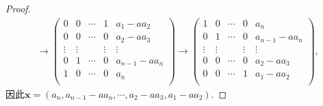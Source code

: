 \documentclass[../../main.tex]{subfiles}
\begin{document}
\begin{proof}
\begin{gather*}
\rightarrow \left( \begin{matrix}
0&		0&		\cdots&		1&		a_1-aa_2\\
0&		0&		\cdots&		0&		a_2-aa_3\\
\vdots&		\vdots&		&		\vdots&		\vdots\\
0&		1&		\cdots&		0&		a_{n-1}-aa_n\\
1&		0&		\cdots&		0&		a_n\\
\end{matrix} \right) \rightarrow \left( \begin{matrix}
1&		0&		\cdots&		0&		a_n\\
0&		1&		\cdots&		0&		a_{n-1}-aa_n\\
\vdots&		\vdots&		&		\vdots&		\vdots\\
0&		0&		\cdots&		0&		a_2-aa_3\\
0&		0&		\cdots&		1&		a_1-aa_2\\
\end{matrix} \right),
\end{gather*}
因此\(\boldsymbol{x}=(a_n,a_{n - 1} - a a_n,\cdots,a_2 - a a_3,a_1 - a a_2)\).
\end{proof}
\end{document}
